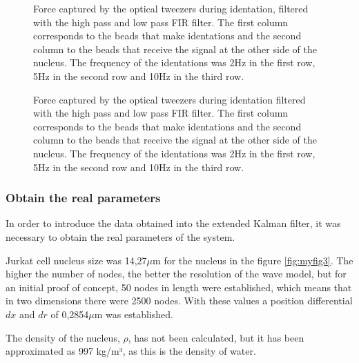 \documentclass[12pt, a4paper]{article} %
\begin{document}
\begin{figure}[htbp]
  \centering
  
  \caption{Force captured by the optical tweezers during identation, filtered with the high pass and low pass FIR filter. The first column corresponds to the beads that make identations and the second column to the beads that receive the signal at the other side of the nucleus. The frequency of the identations was 2Hz in the first row, 5Hz in the second row and 10Hz in the third row.}
  \label{fig:filtered_data}
\end{figure}
\begin{figure}[H]
    \centering
    
  \caption{Force captured by the optical tweezers during identation filtered with the high pass and low pass FIR filter. The first column corresponds to the beads that make identations and the second column to the beads that receive the signal at the other side of the nucleus. The frequency of the identations was 2Hz in the first row, 5Hz in the second row and 10Hz in the third row.}
  \label{fig:fourier_con_filtro_todo}
\end{figure}

\setlength{\parskip}{0mm}

\subsubsection{Obtain the real parameters}

In order to introduce the data obtained into the extended Kalman filter, it was necessary to obtain the real parameters of the system. 

Jurkat cell nucleus size was 14,27$\mu$m for the nucleus in the figure \ref{fig:myfig3}. The higher the number of nodes, the better the resolution of the wave model, but for an initial proof of concept, 50 nodes in length were established, which means that in two dimensions there were 2500 nodes. With these values a position differential $dx$ and $dr$ of 0,2854$\mu$m was established.

\setlength{\parskip}{4mm}

The density of the nucleus, $\rho$, has not been calculated, but it has been approximated as 997 kg/m³, as this is the density of water.
\end{document}
